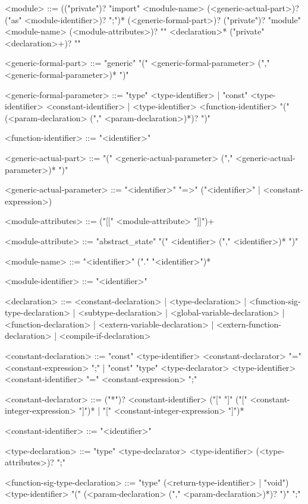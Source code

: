 \documentclass[11pt,letterpaper,twoside,openany]{book}
\begin{document}
\begin{grammar}
<module> ::=
   (("private")? "import" <module-name> (<generic-actual-part>)?
      ("as" <module-identifier>)? ";")*
   (<generic-formal-part>)?
   ("private")? "module" <module-name> (<module-attributes>)? "{"
   <declaration>*
   ("private" <declaration>+)? "}"

<generic-formal-part> ::=
   "generic" "(" <generic-formal-parameter> ("," <generic-formal-parameter>)* ")"

<generic-formal-parameter> ::=
   "type" <type-identifier> |
   "const" <type-identifier> <constant-identifier> |
   <type-identifier> <function-identifier>
      "(" (<param-declaration> ("," <param-declaration>)*)? ")"

<function-identifier> ::= "<identifier>"

<generic-actual-part> ::=
   "(" <generic-actual-parameter> ("," <generic-actual-parameter>)* ")"

<generic-actual-parameter> ::=
   "<identifier>" "=>" ("<identifier>" | <constant-expression>)

<module-attributes> ::= ("[[" <module-attribute> "]]")+

<module-attribute> ::=
   "abstract_state" "(" <identifier> ("," <identifier>)* ")"

<module-name> ::= "<identifier>" ("." "<identifier>")*

<module-identifier> ::= "<identifier>"

<declaration> ::=
   <constant-declaration> |
   <type-declaration> |
   <function-sig-type-declaration> |
   <subtype-declaration> |
   <global-variable-declaration> |
   <function-declaration> |
   <extern-variable-declaration> |
   <extern-function-declaration> |
   <compile-if-declaration>

<constant-declaration> ::=
   "const" <type-identifier> <constant-declarator> "=" <constant-expression> ";" |
   "const" "type" <type-declarator> <type-identifier> <constant-identifier>
      "=" <constant-expression> ";"

<constant-declarator> ::=
   ("*")? <constant-identifier>
             ("[" "]" ("[" <constant-integer-expression> "]")* |
              "[" <constant-integer-expression> "]")*

<constant-identifier> ::= "<identifier>"

<type-declaration> ::=
   "type" <type-declarator> <type-identifier> (<type-attributes>)? ";"

<function-sig-type-declaration> ::=
   "type" (<return-type-identifier> | "void") <type-identifier>
   "(" (<param-declaration> ("," <param-declaration>)*)? ")" ";"


\end{grammar}
\end{document}
